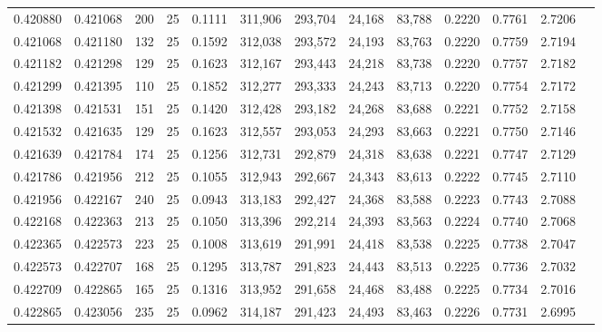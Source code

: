 \begin{tabular}{rrrrrrrrrrrrr}
0.420880 & 0.421068 &   200 &  25 &                                     0.1111 & 311,906 & 293,704 &  24,168 &  83,788 & 0.2220 & 0.7761 & 2.7206 \\
0.421068 & 0.421180 &   132 &  25 &                                     0.1592 & 312,038 & 293,572 &  24,193 &  83,763 & 0.2220 & 0.7759 & 2.7194 \\
0.421182 & 0.421298 &   129 &  25 &                                     0.1623 & 312,167 & 293,443 &  24,218 &  83,738 & 0.2220 & 0.7757 & 2.7182 \\
0.421299 & 0.421395 &   110 &  25 &                                     0.1852 & 312,277 & 293,333 &  24,243 &  83,713 & 0.2220 & 0.7754 & 2.7172 \\
0.421398 & 0.421531 &   151 &  25 &                                     0.1420 & 312,428 & 293,182 &  24,268 &  83,688 & 0.2221 & 0.7752 & 2.7158 \\
0.421532 & 0.421635 &   129 &  25 &                                     0.1623 & 312,557 & 293,053 &  24,293 &  83,663 & 0.2221 & 0.7750 & 2.7146 \\
0.421639 & 0.421784 &   174 &  25 &                                     0.1256 & 312,731 & 292,879 &  24,318 &  83,638 & 0.2221 & 0.7747 & 2.7129 \\
0.421786 & 0.421956 &   212 &  25 &                                     0.1055 & 312,943 & 292,667 &  24,343 &  83,613 & 0.2222 & 0.7745 & 2.7110 \\
0.421956 & 0.422167 &   240 &  25 &                                     0.0943 & 313,183 & 292,427 &  24,368 &  83,588 & 0.2223 & 0.7743 & 2.7088 \\
0.422168 & 0.422363 &   213 &  25 &                                     0.1050 & 313,396 & 292,214 &  24,393 &  83,563 & 0.2224 & 0.7740 & 2.7068 \\
0.422365 & 0.422573 &   223 &  25 &                                     0.1008 & 313,619 & 291,991 &  24,418 &  83,538 & 0.2225 & 0.7738 & 2.7047 \\
0.422573 & 0.422707 &   168 &  25 &                                     0.1295 & 313,787 & 291,823 &  24,443 &  83,513 & 0.2225 & 0.7736 & 2.7032 \\
0.422709 & 0.422865 &   165 &  25 &                                     0.1316 & 313,952 & 291,658 &  24,468 &  83,488 & 0.2225 & 0.7734 & 2.7016 \\
0.422865 & 0.423056 &   235 &  25 &                                     0.0962 & 314,187 & 291,423 &  24,493 &  83,463 & 0.2226 & 0.7731 & 2.6995 \\

\end{tabular}
